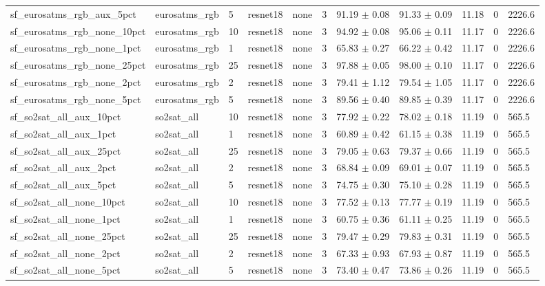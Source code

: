 \begin{tabular}{lllllllllll}
sf_eurosatms_rgb_aux_5pct & eurosatms_rgb & 5 & resnet18 & none & 3 & 91.19 $\pm$ 0.08 & 91.33 $\pm$ 0.09 & 11.18 & 0 & 2226.6 \\
sf_eurosatms_rgb_none_10pct & eurosatms_rgb & 10 & resnet18 & none & 3 & 94.92 $\pm$ 0.08 & 95.06 $\pm$ 0.11 & 11.17 & 0 & 2226.6 \\
sf_eurosatms_rgb_none_1pct & eurosatms_rgb & 1 & resnet18 & none & 3 & 65.83 $\pm$ 0.27 & 66.22 $\pm$ 0.42 & 11.17 & 0 & 2226.6 \\
sf_eurosatms_rgb_none_25pct & eurosatms_rgb & 25 & resnet18 & none & 3 & 97.88 $\pm$ 0.05 & 98.00 $\pm$ 0.10 & 11.17 & 0 & 2226.6 \\
sf_eurosatms_rgb_none_2pct & eurosatms_rgb & 2 & resnet18 & none & 3 & 79.41 $\pm$ 1.12 & 79.54 $\pm$ 1.05 & 11.17 & 0 & 2226.6 \\
sf_eurosatms_rgb_none_5pct & eurosatms_rgb & 5 & resnet18 & none & 3 & 89.56 $\pm$ 0.40 & 89.85 $\pm$ 0.39 & 11.17 & 0 & 2226.6 \\
sf_so2sat_all_aux_10pct & so2sat_all & 10 & resnet18 & none & 3 & 77.92 $\pm$ 0.22 & 78.02 $\pm$ 0.18 & 11.19 & 0 & 565.5 \\
sf_so2sat_all_aux_1pct & so2sat_all & 1 & resnet18 & none & 3 & 60.89 $\pm$ 0.42 & 61.15 $\pm$ 0.38 & 11.19 & 0 & 565.5 \\
sf_so2sat_all_aux_25pct & so2sat_all & 25 & resnet18 & none & 3 & 79.05 $\pm$ 0.63 & 79.37 $\pm$ 0.66 & 11.19 & 0 & 565.5 \\
sf_so2sat_all_aux_2pct & so2sat_all & 2 & resnet18 & none & 3 & 68.84 $\pm$ 0.09 & 69.01 $\pm$ 0.07 & 11.19 & 0 & 565.5 \\
sf_so2sat_all_aux_5pct & so2sat_all & 5 & resnet18 & none & 3 & 74.75 $\pm$ 0.30 & 75.10 $\pm$ 0.28 & 11.19 & 0 & 565.5 \\
sf_so2sat_all_none_10pct & so2sat_all & 10 & resnet18 & none & 3 & 77.52 $\pm$ 0.13 & 77.77 $\pm$ 0.19 & 11.19 & 0 & 565.5 \\
sf_so2sat_all_none_1pct & so2sat_all & 1 & resnet18 & none & 3 & 60.75 $\pm$ 0.36 & 61.11 $\pm$ 0.25 & 11.19 & 0 & 565.5 \\
sf_so2sat_all_none_25pct & so2sat_all & 25 & resnet18 & none & 3 & 79.47 $\pm$ 0.29 & 79.83 $\pm$ 0.31 & 11.19 & 0 & 565.5 \\
sf_so2sat_all_none_2pct & so2sat_all & 2 & resnet18 & none & 3 & 67.33 $\pm$ 0.93 & 67.93 $\pm$ 0.87 & 11.19 & 0 & 565.5 \\
sf_so2sat_all_none_5pct & so2sat_all & 5 & resnet18 & none & 3 & 73.40 $\pm$ 0.47 & 73.86 $\pm$ 0.26 & 11.19 & 0 & 565.5 \\

\end{tabular}
